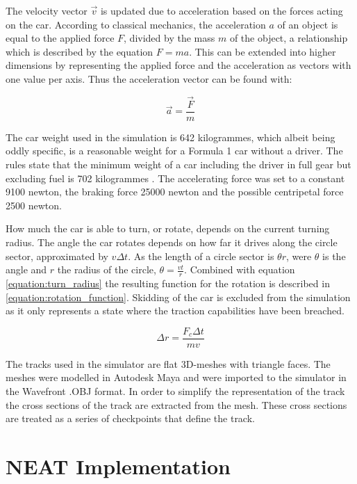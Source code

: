 The velocity vector $\vec{v}$ is updated due to acceleration based on the forces acting on the car. According to classical mechanics, the acceleration $a$ of an object is equal to the applied force $F$, divided by the mass $m$ of the object, a relationship which is described by the equation $F = ma$. This can be extended into higher dimensions by representing the applied force and the acceleration as vectors with one value per axis. Thus the acceleration vector can be found with:

\begin{equation}
    \vec{a} = \frac{\vec{F}}{m}  
\end{equation}

\noindent

The car weight used in the simulation is 642 kilogrammes, which albeit being oddly specific, is a reasonable weight for a Formula 1 car without a driver. The rules state that the minimum weight of a car including the driver in full gear but excluding fuel is 702 kilogrammes \cite{f1_weight}. The accelerating force was set to a constant 9100 newton, the braking force 25000 newton and the possible centripetal force 2500 newton.

How much the car is able to turn, or rotate, depends on the current turning radius. The angle the car rotates depends on how far it drives along the circle sector, approximated by $v\Delta t$. As the length of a circle sector is $\theta r$, were $\theta$ is the angle and $r$ the radius of the circle, \(\theta = \frac{vt}{r}\). Combined with equation \ref{equation:turn_radius} the resulting function for the rotation is described in \ref{equation:rotation_function}. Skidding of the car is excluded from the simulation as it only represents a state where the traction capabilities have been breached.

\begin{equation}
\label{equation:rotation_function}
    \Delta r = \frac{F_c \Delta t}{mv}
\end{equation}

The tracks used in the simulator are flat 3D-meshes with triangle faces. The meshes were modelled in Autodesk Maya and were imported to the simulator in the Wavefront .OBJ format. In order to simplify the representation of the track the cross sections of the track are extracted from the mesh. These cross sections are treated as a series of checkpoints that define the track.  


\section{NEAT Implementation}

